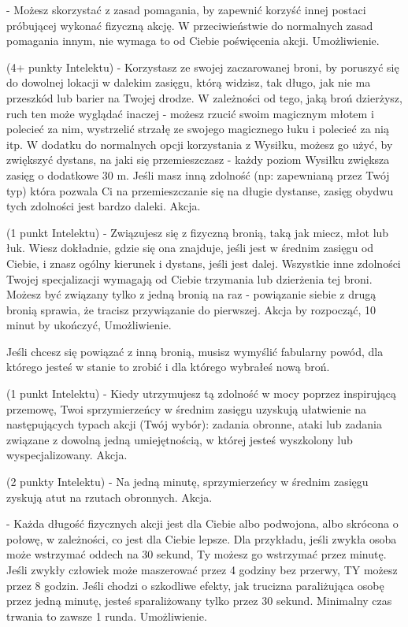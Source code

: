 { - Możesz skorzystać z zasad pomagania, by zapewnić korzyść innej postaci próbującej wykonać fizyczną akcję. W przeciwieństwie do normalnych zasad pomagania innym, nie wymaga to od Ciebie poświęcenia akcji. Umożliwienie.

 (4+ punkty Intelektu) - Korzystasz ze swojej zaczarowanej broni, by poruszyć się do dowolnej lokacji w dalekim zasięgu, którą widzisz, tak długo, jak nie ma przeszkód lub barier na Twojej drodze. W zależności od tego, jaką broń dzierżysz, ruch ten może wyglądać inaczej - możesz rzucić swoim magicznym młotem i polecieć za nim, wystrzelić strzałę ze swojego magicznego łuku i polecieć za nią itp. W dodatku do normalnych opcji korzystania z Wysiłku, możesz go użyć, by zwiększyć dystans, na jaki się przemieszczasz - każdy poziom Wysiłku zwiększa zasięg o dodatkowe 30 m. Jeśli masz inną zdolność (np: zapewnianą przez Twój typ) która pozwala Ci na przemieszczanie się na długie dystanse, zasięg obydwu tych zdolności jest bardzo daleki. Akcja.

 (1 punkt Intelektu) - Związujesz się z fizyczną bronią, taką jak miecz, młot lub łuk. Wiesz dokładnie, gdzie się ona znajduje, jeśli jest w średnim zasięgu od Ciebie, i znasz ogólny kierunek i dystans, jeśli jest dalej. Wszystkie inne zdolności Twojej specjalizacji wymagają od Ciebie trzymania lub dzierżenia tej broni.  Możesz być związany tylko z jedną bronią na raz - powiązanie siebie z drugą bronią sprawia, że tracisz przywiązanie do pierwszej. Akcja by rozpocząć, 10 minut by ukończyć, Umożliwienie. 

Jeśli chcesz się powiązać z inną bronią, musisz wymyślić fabularny powód, dla którego jesteś w stanie  to zrobić i dla którego wybrałeś nową broń.

  (1 punkt Intelektu) - Kiedy utrzymujesz tą zdolność w mocy poprzez inspirującą przemowę, Twoi sprzymierzeńcy w średnim zasięgu uzyskują ułatwienie na następujących typach akcji (Twój wybór): zadania obronne, ataki lub zadania związane z dowolną jedną umiejętnością, w której jesteś wyszkolony lub wyspecjalizowany. Akcja.
 
 (2 punkty Intelektu) - Na jedną minutę, sprzymierzeńcy w średnim zasięgu zyskują atut na rzutach obronnych. Akcja.

 - Każda długość fizycznych akcji jest dla Ciebie albo podwojona, albo skrócona o połowę, w zależności, co jest dla Ciebie lepsze. Dla przykładu, jeśli zwykła osoba może wstrzymać oddech na 30 sekund, Ty możesz go wstrzymać przez minutę. Jeśli zwykły człowiek może maszerować przez 4 godziny bez przerwy, TY możesz przez 8 godzin. Jeśli chodzi o szkodliwe efekty, jak trucizna paraliżująca osobę przez jedną minutę, jesteś sparaliżowany tylko przez 30 sekund. Minimalny czas trwania to zawsze 1 runda. Umożliwienie.

}
